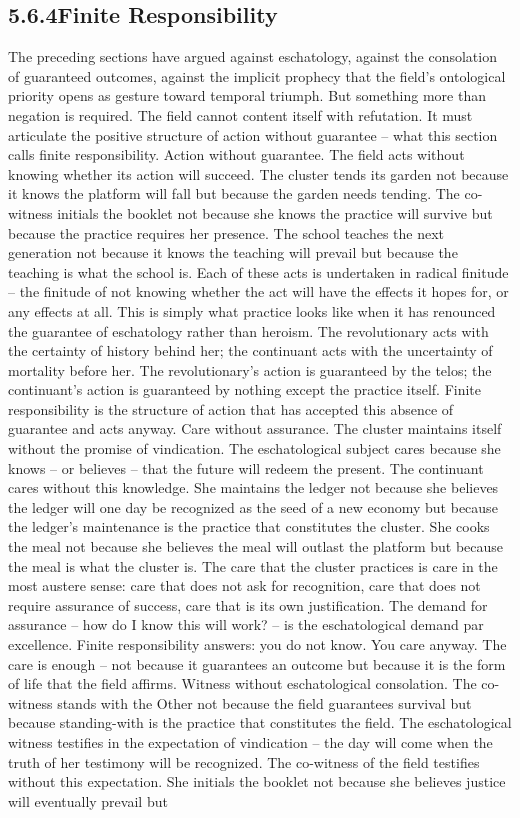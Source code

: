 \subsection{5.6.4\quad Finite Responsibility}

The preceding sections have argued against eschatology, against the consolation of guaranteed outcomes, against the implicit prophecy that the field’s ontological priority opens as gesture toward temporal triumph. But something more than negation is required. The field cannot content itself with refutation. It must articulate the positive structure of action without guarantee – what this section calls finite responsibility. Action without guarantee. The field acts without knowing whether its action will succeed. The cluster tends its garden not because it knows the platform will fall but because the garden needs tending. The co-witness initials the booklet not because she knows the practice will survive but because the practice requires her presence. The school teaches the next generation not because it knows the teaching will prevail but because the teaching is what the school is. Each of these acts is undertaken in radical finitude – the finitude of not knowing whether the act will have the effects it hopes for, or any effects at all. This is simply what practice looks like when it has renounced the guarantee of eschatology rather than heroism. The revolutionary acts with the certainty of history behind her; the continuant acts with the uncertainty of mortality before her. The revolutionary’s action is guaranteed by the telos; the continuant’s action is guaranteed by nothing except the practice itself. Finite responsibility is the structure of action that has accepted this absence of guarantee and acts anyway. Care without assurance. The cluster maintains itself without the promise of vindication. The eschatological subject cares because she knows – or believes – that the future will redeem the present. The continuant cares without this knowledge. She maintains the ledger not because she believes the ledger will one day be recognized as the seed of a new economy but because the ledger’s maintenance is the practice that constitutes the cluster. She cooks the meal not because she believes the meal will outlast the platform but because the meal is what the cluster is. The care that the cluster practices is care in the most austere sense: care that does not ask for recognition, care that does not require assurance of success, care that is its own justification. The demand for assurance – how do I know this will work? – is the eschatological demand par excellence. Finite responsibility answers: you do not know. You care anyway. The care is enough – not because it guarantees an outcome but because it is the form of life that the field affirms. Witness without eschatological consolation. The co-witness stands with the Other not because the field guarantees survival but because standing-with is the practice that constitutes the field. The eschatological witness testifies in the expectation of vindication – the day will come when the truth of her testimony will be recognized. The co-witness of the field testifies without this expectation. She initials the booklet not because she believes justice will eventually prevail but

